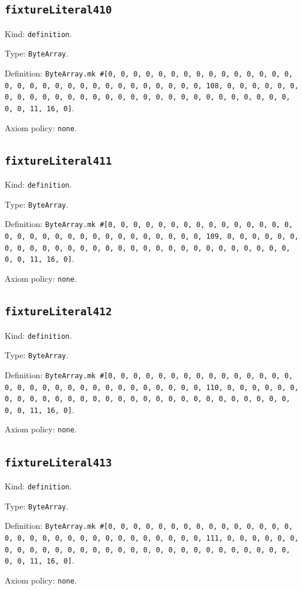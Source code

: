 \documentclass[11pt]{article}
\begin{document}
\subsection*{\texttt{fixtureLiteral410}}
\noindent Kind: \texttt{definition}.\par
\noindent Type: \texttt{ByteArray}.\par
\noindent Definition: \texttt{ByteArray.mk \#[0, 0, 0, 0, 0, 0, 0, 0, 0, 0, 0, 0, 0, 0, 0, 0, 0, 0, 0, 0, 0, 0, 0, 0, 0, 0, 0, 0, 0, 0, 0, 108, 0, 0, 0, 0, 0, 0, 0, 0, 0, 0, 0, 0, 0, 0, 0, 0, 0, 0, 0, 0, 0, 0, 0, 0, 0, 0, 0, 0, 0, 0, 0, 11, 16, 0]}.\par
\noindent Axiom policy: \texttt{none}.\par
\subsection*{\texttt{fixtureLiteral411}}
\noindent Kind: \texttt{definition}.\par
\noindent Type: \texttt{ByteArray}.\par
\noindent Definition: \texttt{ByteArray.mk \#[0, 0, 0, 0, 0, 0, 0, 0, 0, 0, 0, 0, 0, 0, 0, 0, 0, 0, 0, 0, 0, 0, 0, 0, 0, 0, 0, 0, 0, 0, 0, 109, 0, 0, 0, 0, 0, 0, 0, 0, 0, 0, 0, 0, 0, 0, 0, 0, 0, 0, 0, 0, 0, 0, 0, 0, 0, 0, 0, 0, 0, 0, 0, 11, 16, 0]}.\par
\noindent Axiom policy: \texttt{none}.\par
\subsection*{\texttt{fixtureLiteral412}}
\noindent Kind: \texttt{definition}.\par
\noindent Type: \texttt{ByteArray}.\par
\noindent Definition: \texttt{ByteArray.mk \#[0, 0, 0, 0, 0, 0, 0, 0, 0, 0, 0, 0, 0, 0, 0, 0, 0, 0, 0, 0, 0, 0, 0, 0, 0, 0, 0, 0, 0, 0, 0, 110, 0, 0, 0, 0, 0, 0, 0, 0, 0, 0, 0, 0, 0, 0, 0, 0, 0, 0, 0, 0, 0, 0, 0, 0, 0, 0, 0, 0, 0, 0, 0, 11, 16, 0]}.\par
\noindent Axiom policy: \texttt{none}.\par
\subsection*{\texttt{fixtureLiteral413}}
\noindent Kind: \texttt{definition}.\par
\noindent Type: \texttt{ByteArray}.\par
\noindent Definition: \texttt{ByteArray.mk \#[0, 0, 0, 0, 0, 0, 0, 0, 0, 0, 0, 0, 0, 0, 0, 0, 0, 0, 0, 0, 0, 0, 0, 0, 0, 0, 0, 0, 0, 0, 0, 111, 0, 0, 0, 0, 0, 0, 0, 0, 0, 0, 0, 0, 0, 0, 0, 0, 0, 0, 0, 0, 0, 0, 0, 0, 0, 0, 0, 0, 0, 0, 0, 11, 16, 0]}.\par
\noindent Axiom policy: \texttt{none}.\par
\end{document}
